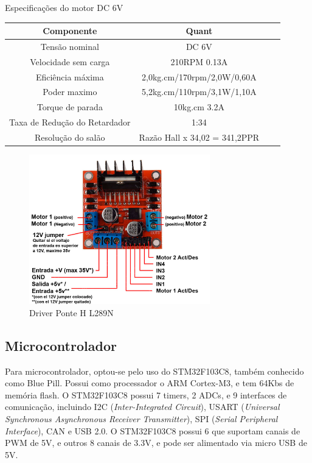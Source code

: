 \begin{quadro}[htb]
	\caption{\label{Especificacoes_motordc_6v}Especificações do motor DC 6V}
	 \begin{tabular}{|c|c|c|c|}
		\hline
		\textbf{Componente} & \textbf{Quant} \\ \hline
		Tensão nominal & DC 6V  \\ \hline
		Velocidade sem carga  & 210RPM 0.13A  \\ \hline
		Eficiência máxima & 2,0kg.cm/170rpm/2,0W/0,60A   \\ \hline
		Poder maximo & 5,2kg.cm/110rpm/3,1W/1,10A   \\ \hline
		Torque de parada  & 10kg.cm 3.2A    \\ \hline
		Taxa de Redução do Retardador & 1:34  \\ \hline
		Resolução do salão & Razão Hall x 34,02 = 341,2PPR  \\ \hline
	\end{tabular}
	\end{quadro}

\begin{figure}[h]
	\centering
	\includegraphics[width=0.7\textwidth]{figures/l289n}
	\caption{Driver Ponte H L289N \cite{l289n}}
\end{figure}

\subsection{Microcontrolador}

Para microcontrolador, optou-se pelo uso do  STM32F103C8, também conhecido como Blue Pill.
Possui como processador o ARM Cortex-M3, e tem 64Kbs de memória flash. 
O STM32F103C8 possui 7 timers, 2 ADCs, e 9 interfaces de comunicação, incluindo
I2C (\textit{Inter-Integrated Circuit}), USART (\textit{Universal Synchronous
Asynchronous Receiver Transmitter}), SPI (\textit{Serial Peripheral Interface}),
CAN e USB 2.0.
O STM32F103C8 possui 6 que suportam canais de PWM de 5V, e outros 8 canais de 3.3V,  e pode ser alimentado via micro
USB de 5V.

